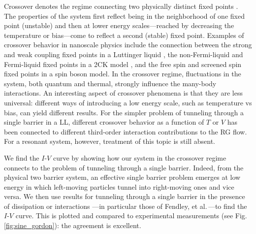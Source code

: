 \documentclass[aps,prb,reprint,floatfix,superscriptaddress,amssymb,amsmath]{revtex4-2}
\newcommand{\hub}[1]{\textcolor{red}{#1}}
\begin{document}
Crossover denotes the regime connecting two physically distinct fixed points \cite{CardyCFT84,VojtaPhilMag06}. The properties of the system first reflect being in the neighborhood of one fixed point (unstable) and then at lower energy scales---reached by decreasing the temperature or bias---come to reflect a second (stable) fixed point. Examples of crossover behavior in nanoscale physics include the connection between the strong and weak coupling fixed points in a Luttinger liquid \cite{LoCrossoverPRB19}, the non-Fermi-liquid and Fermi-liquid fixed points in a 2CK model \cite{FabrizioCrossoverPRL95}, and the free spin and screened spin fixed points in a spin boson model.
In the crossover regime, fluctuations in the system, both quantum and thermal, strongly influence the many-body interactions. 
An interesting aspect of crossover phenomena is that they are less universal: different ways of introducing a low energy scale, such as temperature vs bias, can yield different results. For the simpler problem of tunneling through a single barrier in a LL, different crossover behavior as a function of $T$ or $V$ has been connected \cite{AristovWoelfle09} to different third-order interaction contributions to the RG flow. For a resonant system, however, treatment of this topic is still absent. 

We find the $I$-$V$ curve by showing how our system in the crossover regime connects to the problem of tunneling through a single barrier. Indeed, from the physical two barrier system, an effective single barrier problem emerges at low energy in which left-moving particles tunnel into right-moving ones and vice versa. We then use results for tunneling through a single barrier in the presence of dissipation or interactions \cite{GiamarchiBook,GogolinBook,AnthoreUniversalityRevEPJST20}---in particular those of Fendley, et al.\,\cite{FendleySaleurWarnerNPB94,FendleyPRL95,FendleyPRB95,FendleyUnifiedFrameJSP96,FendleySaleur96}---to find the $I$-$V$ curve. This is plotted and compared to experimental measurements (see Fig.\,\ref{fig:sine_gordon}): the agreement is excellent. 
\end{document}
